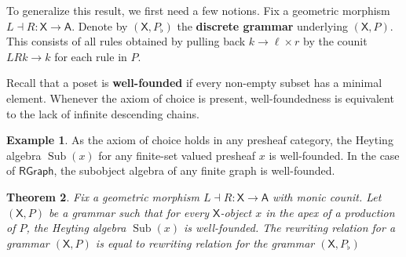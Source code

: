 \documentclass{amsart}
\newcommand{\A}{\cat{A}}
\newcommand{\X}{\cat{X}}
\newcommand{\RGraph}{\cat{RGraph}}
\newcommand{\defn}[1]{\textbf{#1}}
\newcommand{\cat}[1]{\mathsf{#1}}
\newcommand{\from}{\colon}
\DeclareMathOperator{\Sub}{Sub}
\newtheorem{theorem}{Theorem}[section]
\theoremstyle{remark}
\theoremstyle{definition}
\newtheorem{example}[theorem]{Example}
\begin{document}
To generalize this result, we first need a few notions.  Fix a
geometric morphism $ L \dashv R \from \X \to \A $. Denote by
$ ( \X , P_\flat ) $ the \defn{discrete grammar} underlying
$ ( \X , P ) $. This consists of all rules obtained by pulling back
$ k \to \ell \times r $ by the counit $ LRk \to k $ for each rule in
$ P $.

Recall that a poset is \textbf{well-founded} if every non-empty subset
has a minimal element.  Whenever the axiom of choice is present,
well-foundedness is equivalent to the lack of infinite descending
chains.

\begin{example}
  As the axiom of choice holds in any presheaf category, the Heyting
  algebra $ \Sub ( x ) $ for any finite-set valued presheaf $ x $ is
  well-founded. In the case of $ \RGraph $, the subobject algebra of
  any finite graph is well-founded.
\end{example}

\begin{theorem}
\label{thm:production-same-rewrite-relation-as-discrete}
Fix a geometric morphism $ L \dashv R \from \X \to \A $ with monic
counit. Let $ ( \X , P ) $ be a grammar such that for every
$ \X $-object $ x $ in the apex of a production of $ P $, the Heyting
algebra $ \Sub (x) $ is well-founded.  The rewriting relation for a
grammar $ ( \X , P ) $ is equal to rewriting relation for the grammar
$ ( \X , P_{\flat} ) $
\end{theorem}
\end{document}
